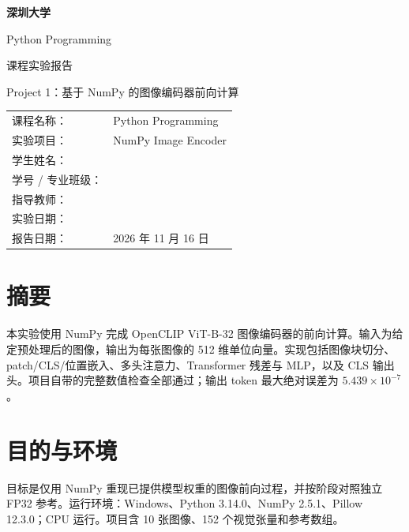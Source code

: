 \documentclass[UTF8,12pt,a4paper]{ctexart}
\begin{document}
\begin{titlepage}\centering\vspace*{2cm}
{\Huge\bfseries 深圳大学\par}\vspace{1cm}
{\Large Python Programming\par}\vspace{0.8cm}
{\Huge\color{blue!65!black}课程实验报告\par}\vspace{0.5cm}
{\Large Project 1：基于 NumPy 的图像编码器前向计算\par}\vspace{2cm}
\begin{tabular}{ll}
课程名称：& Python Programming\\[0.5em]
实验项目：& NumPy Image Encoder\\[0.5em]
学生姓名：& \underline{\hspace{7cm}}\\[0.5em]
学号 / 专业班级：& \underline{\hspace{6cm}}\\[0.5em]
指导教师：& \underline{\hspace{7cm}}\\[0.5em]
实验日期：& \underline{\hspace{7cm}}\\[0.5em]
报告日期：& 2026 年 11 月 16 日
\end{tabular}
\vfill{\color{workred}}\end{titlepage}

\section*{摘要}
本实验使用 NumPy 完成 OpenCLIP ViT-B-32 图像编码器的前向计算。输入为给定预处理后的图像，输出为每张图像的 512 维单位向量。实现包括图像块切分、patch/CLS/位置嵌入、多头注意力、Transformer 残差与 MLP，以及 CLS 输出头。项目自带的完整数值检查全部通过；输出 token 最大绝对误差为 $5.439\times10^{-7}$。

\section{目的与环境}
目标是仅用 NumPy 重现已提供模型权重的图像前向过程，并按阶段对照独立 FP32 参考。运行环境：Windows、Python 3.14.0、NumPy 2.5.1、Pillow 12.3.0；CPU 运行。项目含 10 张图像、152 个视觉张量和参考数组。
\end{document}
